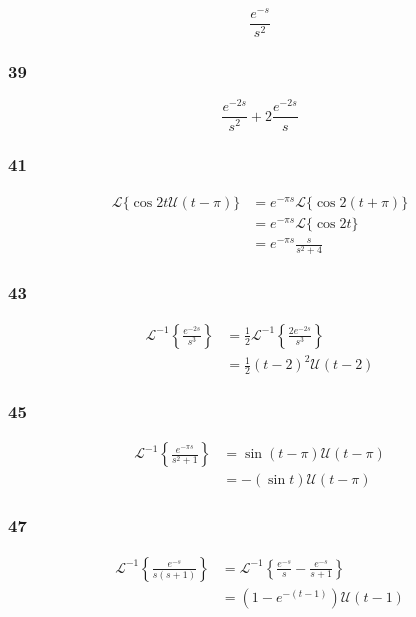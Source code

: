 \documentclass{article}
\begin{document}
\[\frac{e^{-s}}{s^2}\]

\subsubsection{39}

\[\frac{e^{-2 s}}{s^2} + 2 \frac{e^{-2 s}}{s}\]

\subsubsection{41}

\begin{align*}
  \mathcal{L}\{\cos 2t \mathcal{U} (t - \pi)\} & = e^{-\pi s} \mathcal{L}\{\cos 2 (t + \pi)\} \\
                                               & = e^{-\pi s} \mathcal{L}\{\cos 2 t\}         \\
                                               & = e^{-\pi s} \frac{s}{s^2 + 4}
\end{align*}

\subsubsection{43}

\begin{align*}
  \mathcal{L}^{-1} \left\{ \frac{e^{-2 s}}{s^3} \right\} & = \frac{1}{2} \mathcal{L}^{-1} \left\{ \frac{2 e^{-2 s}}{s^3} \right\} \\
                                                         & = \frac{1}{2} (t - 2)^2 \mathcal{U}(t - 2)
\end{align*}

\subsubsection{45}

\begin{align*}
  \mathcal{L}^{-1} \left\{ \frac{e^{-\pi s}}{s^2 + 1} \right\} & = \sin (t - \pi) \mathcal{U} (t - \pi) \\
                                                               & = -(\sin t) \mathcal{U} (t - \pi)
\end{align*}

\subsubsection{47}

\begin{align*}
  \mathcal{L}^{-1} \left\{ \frac{e^{-s}}{s (s + 1)} \right\} & = \mathcal{L}^{-1} \left\{ \frac{e^{-s}}{s} - \frac{e^{-s}}{s + 1} \right\} \\
                                                             & = \left( 1 - e^{-(t - 1)} \right) \mathcal{U}(t - 1)
\end{align*}
\end{document}
